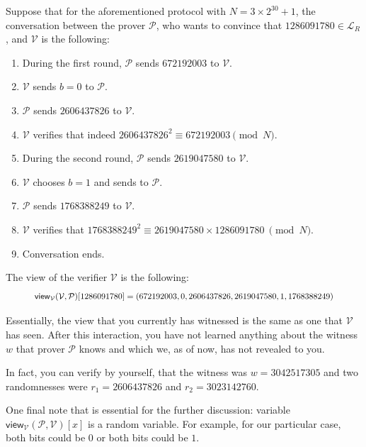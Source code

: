 \documentclass[../lecture-notes-148x210.tex]{subfiles}
\begin{document}
\begin{example}
    Suppose that for the aforementioned protocol with $N=3 \times 2^{30} + 1$, the conversation between the prover $\mathcal{P}$, who wants to convince that $1286091780 \in \mathcal{L}_R$, and $\mathcal{V}$ is the following:
    \begin{enumerate} %
        \item During the first round, $\mathcal{P}$ sends $672192003$ to $\mathcal{V}$.
        \item $\mathcal{V}$ sends $b=0$ to $\mathcal{P}$.
        \item $\mathcal{P}$ sends $2606437826$ to $\mathcal{V}$.
        \item $\mathcal{V}$ verifies that indeed $2606437826^2 \equiv 672192003 \pmod{N}$.
        \item During the second round, $\mathcal{P}$ sends $2619047580$ to $\mathcal{V}$.
        \item $\mathcal{V}$ chooses $b=1$ and sends to $\mathcal{P}$.
        \item $\mathcal{P}$ sends $1768388249$ to $\mathcal{V}$.
        \item $\mathcal{V}$ verifies that $1768388249^2 \equiv 2619047580 \times 1286091780~\pmod{N}$.
        \item Conversation ends.
    \end{enumerate}

    The view of the verifier $\mathcal{V}$ is the following: 
    \begin{equation*}
        \scalebox{0.85}{
            $\mathsf{view}_{\mathcal{V}}(\mathcal{V}, \mathcal{P})[1286091780] = (672192003, 0, 2606437826, 2619047580, 1, 1768388249)$
        }
    \end{equation*}

    Essentially, the view that you currently has witnessed is the same as one that $\mathcal{V}$ has seen. After this interaction, you have not learned anything about the witness $w$ that prover $\mathcal{P}$ knows and which we, as of now, has not revealed to you.

    In fact, you can verify by yourself, that the witness was $w = 3042517305$ and two randomnesses were $r_1 = 2606437826$ and $r_2 = 3023142760$.

    One final note that is essential for the further discussion: variable $\mathsf{view}_{\mathcal{V}}(\mathcal{P}, \mathcal{V})[x]$ is a random variable. For example, for our particular case, both bits could be $0$ or both bits could be $1$. 
\end{example}
\end{document}
